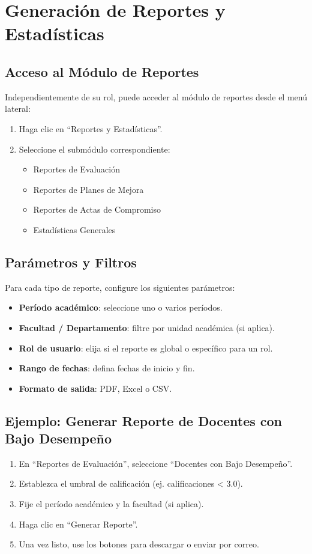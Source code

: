 \documentclass[12pt,a4paper]{book}
\begin{document}
\chapter{Generación de Reportes y Estadísticas}
\section{Acceso al Módulo de Reportes}
Independientemente de su rol, puede acceder al módulo de reportes desde el menú lateral:

\begin{enumerate}
    \item Haga clic en “Reportes y Estadísticas”.
    \item Seleccione el submódulo correspondiente:
\begin{itemize}
        \item Reportes de Evaluación
        \item Reportes de Planes de Mejora
        \item Reportes de Actas de Compromiso
        \item Estadísticas Generales
    \end{itemize}
\end{enumerate}
    
\section{Parámetros y Filtros}
Para cada tipo de reporte, configure los siguientes parámetros:
\begin{itemize}
    \item \textbf{Período académico}: seleccione uno o varios períodos.
    \item \textbf{Facultad / Departamento}: filtre por unidad académica (si aplica).
    \item \textbf{Rol de usuario}: elija si el reporte es global o específico para un rol.
    \item \textbf{Rango de fechas}: defina fechas de inicio y fin.
    \item \textbf{Formato de salida}: PDF, Excel o CSV.
\end{itemize}
    
\section{Ejemplo: Generar Reporte de Docentes con Bajo Desempeño}
\begin{enumerate}
    \item En “Reportes de Evaluación”, seleccione “Docentes con Bajo Desempeño”.
    \item Establezca el umbral de calificación (ej. calificaciones < 3.0).
    \item Fije el período académico y la facultad (si aplica).
    \item Haga clic en “Generar Reporte”.
    \item Una vez listo, use los botones para descargar o enviar por correo.
\end{enumerate}
    
\end{document}
